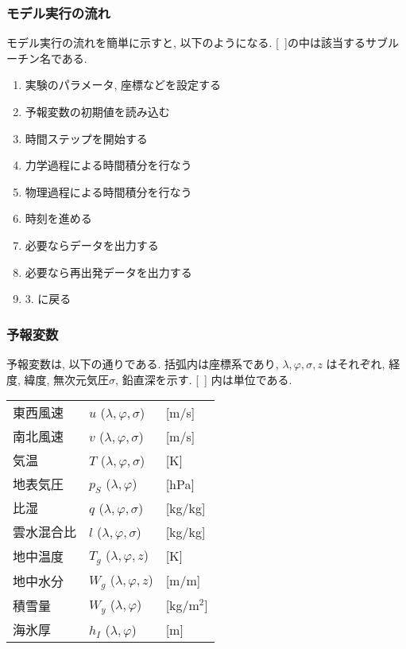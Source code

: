 \subsubsection{モデル実行の流れ}

モデル実行の流れを簡単に示すと, 以下のようになる.
[\ ]の中は該当するサブルーチン名である.

\begin{enumerate}
\item 実験のパラメータ, 座標などを設定する 
\item 予報変数の初期値を読み込む 
\item 時間ステップを開始する 
\item 力学過程による時間積分を行なう 
\item 物理過程による時間積分を行なう 
\item 時刻を進める 
\item 必要ならデータを出力する 
\item 必要なら再出発データを出力する 
\item 3. に戻る
\end{enumerate}

\subsubsection{予報変数}

予報変数は, 以下の通りである.
括弧内は座標系であり, $\lambda,\varphi,\sigma, z$ はそれぞれ,
経度, 緯度, 無次元気圧$\sigma$, 鉛直深を示す.
[\ ] 内は単位である.

\begin{tabular}{lll}
東西風速 & $u$ ($\lambda,\varphi,\sigma$) & [m/s] \\
南北風速 & $v$ ($\lambda,\varphi,\sigma$) & [m/s] \\
気温     & $T$ ($\lambda,\varphi,\sigma$) & [K] \\
地表気圧 & $p_S$ ($\lambda,\varphi$) & [hPa] \\
比湿     & $q$ ($\lambda,\varphi,\sigma$) & [kg/kg] \\
雲水混合比 &  $l$ ($\lambda,\varphi,\sigma$) & [kg/kg] \\
地中温度 & $T_g$ ($\lambda,\varphi,z$) & [K] \\
地中水分 & $W_g$ ($\lambda,\varphi,z$) & [m/m] \\
積雪量   & $W_y$ ($\lambda,\varphi$) & [kg/m$^2$] \\
海氷厚   & $h_I$ ($\lambda,\varphi$) & [m]
\end{tabular}

